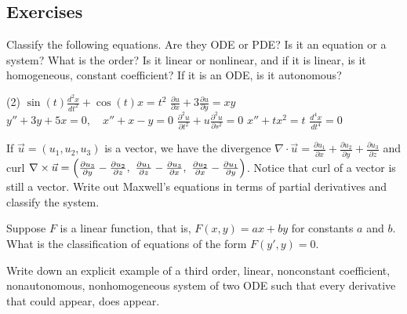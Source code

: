 \subsection{Exercises}

\begin{exercise}
Classify the following equations.  Are they ODE or PDE\@?  Is it an equation
or a system?  What is the order?  Is it linear or nonlinear, and if it is
linear, is it homogeneous, constant coefficient?  If it is an ODE\@, is it
autonomous?
\begin{tasks}(2)
\task $\displaystyle \sin(t) \frac{d^2 x}{dt^2} + \cos(t) x = t^2$
\task $\displaystyle \frac{\partial u}{\partial x} + 3 \frac{\partial u}{\partial y} = xy$
\task $\displaystyle y''+3y+5x=0, \quad x''+x-y=0$
\task $\displaystyle \frac{\partial^2 u}{\partial t^2} + u\frac{\partial^2 u}{\partial s^2} =
0$
\task $\displaystyle x''+tx^2=t$
\task $\displaystyle \frac{d^4 x}{dt^4} = 0$
\end{tasks}
\end{exercise}

\begin{exercise}
If $\vec{u} = (u_1,u_2,u_3)$ is a vector, we have the divergence
$\nabla \cdot \vec{u} =
\frac{\partial u_1}{\partial x} +
\frac{\partial u_2}{\partial y} +
\frac{\partial u_3}{\partial z}$ and curl
$\nabla \times \vec{u} =
\Bigl(
\frac{\partial u_3}{\partial y} - \frac{\partial u_2}{\partial z} , ~
\frac{\partial u_1}{\partial z} - \frac{\partial u_3}{\partial x} , ~
\frac{\partial u_2}{\partial x} - \frac{\partial u_1}{\partial y} \Bigr)$.
Notice that curl of a vector is still a vector.  Write out Maxwell's
equations in terms of partial derivatives and classify the system.
\end{exercise}

\begin{exercise}
Suppose $F$ is a linear function, that is,
$F(x,y) = ax+by$ for constants $a$ and $b$.  What is the
classification of equations of the form $F(y',y) = 0$.
\end{exercise}

\begin{exercise}
Write down an explicit example of a third order, linear, nonconstant coefficient,
nonautonomous, nonhomogeneous system of two ODE such that every derivative
that could appear, does appear.
\end{exercise}

\setcounter{exercise}{100}

